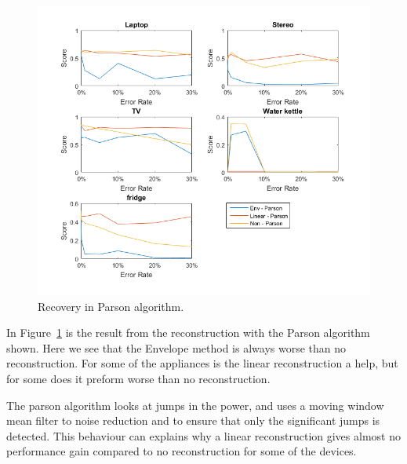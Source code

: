 \newpage

\begin{figure}[H]
\centering
\includegraphics[width=1\textwidth]{billeder/Rec-Parson.png}
\caption{Recovery in Parson algorithm.}
\label{fig:ERPARSON}
\end{figure}

In Figure~\ref{fig:ERPARSON} is the result from the reconstruction with the Parson algorithm shown. Here we see that the Envelope method is always worse than no reconstruction. For some of the appliances is the linear reconstruction a help, but for some does it preform worse than no reconstruction. 

The parson algorithm looks at jumps in the power, and uses a moving window mean filter to noise reduction and to ensure that only the significant jumps is detected. This behaviour can explains why a linear reconstruction gives almost no performance gain compared to no reconstruction for some of the devices.
 
